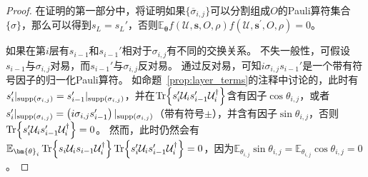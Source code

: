 \begin{lemma}
\begin{proof}
    在证明的第一部分中，将证明如果$\{\overline{\sigma}_{i,j}\}$可以分割组成$O$的Pauli算符集合$\{\sigma\}$，那么可以得到$s_L= s_L'$，否则$\mathbb{E}_{\bm{\theta}}f(\mathcal{U},\bm{s},O,\rho)f(\mathcal{U},\bm{s^{\prime}},O,\rho)=0$。
    
    如果在第$i$层有$s_{i-1}$和$s_{i-1}'$相对于$\sigma_{i,j}$有不同的交换关系。 
    不失一般性，可假设$s_{i-1}$与$\sigma_{i,j}$对易，而$s_{i-1}'$与$\sigma_{i,j}$反对易。 
    通过反对易，可知$i \sigma_{i,j} s_{i-1}'$是一个带有符号因子的归一化Pauli算符。 
    如命题~\ref{prop:layer_terms}的注释中讨论的，此时有$s_{i}'|_{{\text{supp} \left( \sigma_{i,j} \right)}}=s_{i-1}'|_{{\text{supp} \left( \sigma_{i,j} \right)}}$，并在$\Tr{s'_i\mathcal{U}_i s'_{i-1}\mathcal{U}_i^\dagger}$含有因子$\cos{\theta_{i,j}}$，或者$s_{i}'|_{{\text{supp} \left( \sigma_{i,j} \right)}}=\left(i\sigma_{i,j} s_{i-1}'\right)|_{{\text{supp} \left( \sigma_{i,j} \right)}}$（带有符号$\pm$），并含有因子$\sin{\theta_{i,j}}$，否则$\Tr{s'_i\mathcal{U}_i s'_{i-1}\mathcal{U}_i^\dagger}=0$。 
    然而，此时仍然会有$\mathbb{E}_{\bm{\theta}_i}\Tr{s_i\mathcal{U}_i s_{i-1}\mathcal{U}_i^\dagger}\Tr{s'_i\mathcal{U}_i s'_{i-1}\mathcal{U}_i^\dagger}=0$，因为$\mathbb{E}_{\theta_{i,j}} \sin{\theta_{i,j}}=\mathbb{E}_{\theta_{i,j}} \cos{\theta_{i,j}}=0$。
    

\end{proof}
\end{lemma}

